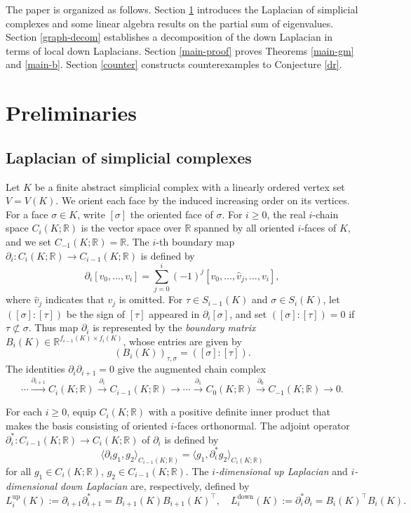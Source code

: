 \documentclass[12pt]{amsart}
\theoremstyle{plain}
\theoremstyle{definition}
\numberwithin{equation}{section}
\numberwithin{figure}{section}
\newcommand{\Ldown}{L^{\operatorname{down}}}
\newcommand{\Lup}{L^{\operatorname{up}}}
\newcommand{\p}{\partial}
\newcommand{\R}{\mathbb R}
\begin{document}
The paper is organized as follows.
Section \ref{pre} introduces the Laplacian of simplicial complexes and some linear algebra results on the partial sum of eigenvalues.
Section \ref{graph-decom} establishes a decomposition of the down Laplacian in terms of local down Laplacians.
Section \ref{main-proof} proves Theorems \ref{main-gm} and \ref{main-b}.
Section \ref{counter} constructs counterexamples to Conjecture \ref{dr}.


\section{Preliminaries}\label{pre}

\subsection{Laplacian of simplicial complexes}
Let $K$ be a finite abstract simplicial complex with a linearly ordered vertex set $V=V(K)$.
We orient each face by the induced increasing order on its vertices.
For a face $\sigma \in K$, write $[\sigma]$ the oriented face of $\sigma$.
For $i\geq 0$, the real $i$-chain space $C_i(K;\R)$ is the vector space over $\R$ spanned by all oriented $i$-faces of $K$, and we set $C_{-1}(K;\R)=\R$.
The $i$-th boundary map $\p_i:C_i(K;\R)\to C_{i-1}(K;\R)$ is defined by
\[
\p_i[v_0,\ldots,v_i]
=
\sum_{j=0}^i(-1)^j[v_0,\ldots,\widehat v_j,\ldots,v_i],
\]
where $\widehat v_j$ indicates that $v_j$ is omitted.
For $\tau \in S_{i - 1}(K)$ and $\sigma \in S_i(K)$, let $([\sigma]:[\tau])$  be the sign of $[\tau]$ appeared in $\p_i [\sigma]$, and set $([\sigma]: [\tau]) = 0$ if $\tau \not\subset \sigma$.
Thus map $\p_i$ is represented by the \emph{boundary matrix}
$B_i(K) \in \R^{f_{i-1}(K) \times f_i(K)}$,
whose entries are given by
\begin{equation}\label{BouMat}
(B_i(K))_{\tau,\sigma}
=
([\sigma]:[\tau]).
\end{equation}
The identities $\p_i\p_{i+1}=0$ give the augmented chain complex
\[
\cdots \xrightarrow{\p_{i+1}} C_i(K;\R) \xrightarrow{\p_i} C_{i-1}(K;\R)
\to\cdots \xrightarrow{\p_1} C_0(K;\R) \xrightarrow{\p_0} C_{-1}(K;\R) \to 0.
\]

For each $i \geq 0$, equip $C_i(K;\R)$ with a positive definite inner product that makes the basis consisting of oriented $i$-faces orthonormal.
The adjoint operator $\p_i^*: C_{i-1}(K;\R) \to C_{i}(K;\R)$ of $\p_i$ is defined by
\[
\langle \p_i g_1, g_2 \rangle_{C_{i-1}(K;\R)} = \langle g_1, \p_i^* g_2\rangle_{C_i(K;\R)}
\]
for all $g_1 \in C_i(K;\R)$, $g_2 \in C_{i-1}(K;\R)$.
The \emph{$i$-dimensional up Laplacian} and \emph{$i$-dimensional down Laplacian} are, respectively, defined by
\[
\Lup_{i}(K) :=\p_{i+1}\p_{i+1}^* = B_{i+1}(K) B_{i+1}(K)^\top,
\quad
\Ldown_{i}(K) :=\p_{i}^*\p_{i} = B_i(K)^\top B_i(K).
\]
\end{document}
